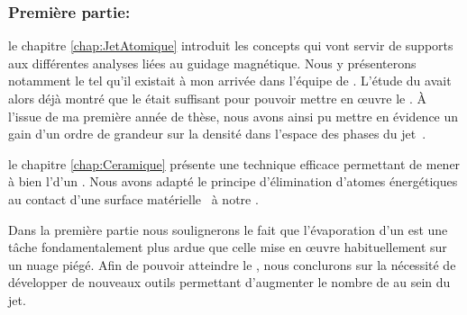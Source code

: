 \subsubsection{Première partie: \TitrePartieUn}
\begin{ditemize}
%
	\item le chapitre \ref{chap:JetAtomique} introduit les concepts qui vont servir de supports aux différentes analyses liées au guidage magnétique. Nous y présenterons notamment le \setup tel qu'il existait à mon arrivée dans l'équipe de \dgo. L'étude du \jatgm avait alors déjà montré que le \tcolel était suffisant pour pouvoir mettre en \oe uvre le \rpef. \`A l'issue de ma première année de thèse, nous avons ainsi pu mettre en évidence un gain d'un ordre de grandeur sur la densité dans l'espace des phases du jet~\cite{LWR05}.
%
	\item le chapitre \ref{chap:Ceramique} présente une technique efficace permettant de mener à bien l'\evap d'un \jatmg. Nous avons adapté le principe d'élimination d'atomes énergétiques au contact d'une surface matérielle~\cite{HMO03} à notre \setup. 
%
\end{ditemize}
Dans la première partie nous soulignerons le fait que l'évaporation d'un \jat est une tâche fondamentalement plus ardue que celle mise en \oe uvre habituellement sur un nuage piégé. Afin de pouvoir atteindre le \rdq, nous conclurons sur la nécessité de développer de nouveaux outils permettant d'augmenter le nombre de \colels au sein du jet. 


